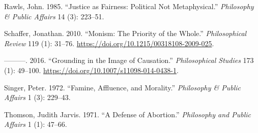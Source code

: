 \documentclass[
  12pt,
  letterpaper,
  DIV=11,
  numbers=noendperiod]{scrartcl}
\newlength{\cslhangindent}
\newenvironment{CSLReferences}[2] %
 {\begin{list}{}{%
  \setlength{\itemindent}{0pt}
  \setlength{\leftmargin}{0pt}
  \setlength{\parsep}{0pt}
  \ifodd #1
   \setlength{\leftmargin}{\cslhangindent}
   \setlength{\itemindent}{-1\cslhangindent}
  \fi
  \setlength{\itemsep}{#2\baselineskip}}}
 {\end{list}}
\begin{document}
\begin{CSLReferences}{1}{0}
Rawls, John. 1985. {``Justice as Fairness: Political Not
Metaphysical.''} \emph{Philosophy \& Public Affairs} 14 (3): 223--51.

Schaffer, Jonathan. 2010. {``Monism: The Priority of the Whole.''}
\emph{Philosophical Review} 119 (1): 31--76.
\url{https://doi.org/10.1215/00318108-2009-025}.

---------. 2016. {``Grounding in the Image of Causation.''}
\emph{Philosophical Studies} 173 (1): 49--100.
\url{https://doi.org/10.1007/s11098-014-0438-1}.

Singer, Peter. 1972. {``Famine, Affluence, and Morality.''}
\emph{Philosophy \& Public Affairs} 1 (3): 229--43.

Thomson, Judith Jarvis. 1971. {``A Defense of Abortion.''}
\emph{Philosophy and Public Affairs} 1 (1): 47--66.

\end{CSLReferences}
\end{document}
